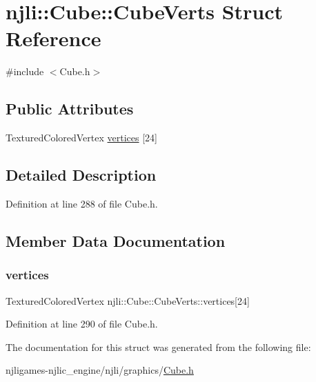 \hypertarget{structnjli_1_1_cube_1_1_cube_verts}{}\section{njli\+:\+:Cube\+:\+:Cube\+Verts Struct Reference}
\label{structnjli_1_1_cube_1_1_cube_verts}


{\ttfamily \#include $<$Cube.\+h$>$}

\subsection*{Public Attributes}
\begin{DoxyCompactItemize}
\item 
Textured\+Colored\+Vertex \mbox{\hyperlink{structnjli_1_1_cube_1_1_cube_verts_a426460bcb49986df85666bd7cd0875fb}{vertices}} \mbox{[}24\mbox{]}
\end{DoxyCompactItemize}


\subsection{Detailed Description}


Definition at line 288 of file Cube.\+h.



\subsection{Member Data Documentation}
\mbox{\label{structnjli_1_1_cube_1_1_cube_verts_a426460bcb49986df85666bd7cd0875fb}} 
\subsubsection{\texorpdfstring{vertices}{vertices}}
{\footnotesize\ttfamily Textured\+Colored\+Vertex njli\+::\+Cube\+::\+Cube\+Verts\+::vertices\mbox{[}24\mbox{]}}



Definition at line 290 of file Cube.\+h.



The documentation for this struct was generated from the following file\+:\begin{DoxyCompactItemize}
\item 
njligames-\/njlic\+\_\+engine/njli/graphics/\mbox{\hyperlink{_cube_8h}{Cube.\+h}}\end{DoxyCompactItemize}
